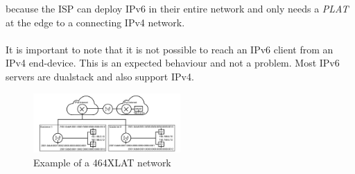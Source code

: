 \documentclass[format=sigconf, natbib=true, nonacm=true]{acmart}
\begin{document}
because the ISP can deploy IPv6 in their entire network and only needs a \textit{PLAT} at the edge to a connecting IPv4 network.\\\\It is important to note that it is not possible to reach an IPv6 client from an IPv4 end-device. This is an expected behaviour and not a problem. Most IPv6 servers are dualstack and also support IPv4.
    \begin{figure}
        \centering
        \includegraphics[width=0.5\textwidth]{images/464_xlat.png}
        \caption{Example of a 464XLAT network}
        \label{fig:646_XLAT}
    \end{figure}
\end{document}
